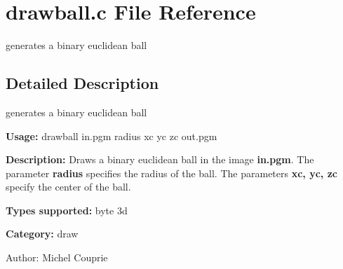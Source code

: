 \section{drawball.c File Reference}
\label{drawball_8c}
generates a binary euclidean ball  




\label{_details}
\subsection{Detailed Description}
generates a binary euclidean ball 

{\bf Usage:} drawball in.pgm radius xc yc zc out.pgm

{\bf Description:} Draws a binary euclidean ball in the image {\bf in.pgm}. The parameter {\bf radius} specifies the radius of the ball. The parameters {\bf xc, yc, zc} specify the center of the ball.

{\bf Types supported:} byte 3d

{\bf Category:} draw

\begin{Desc}
\item[Author:]Michel Couprie \end{Desc}
